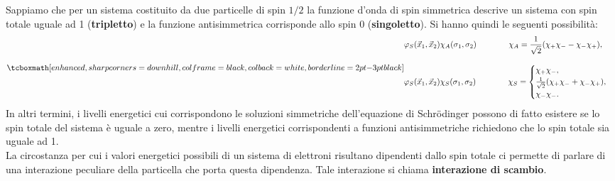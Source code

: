 Sappiamo che per un sistema costituito da due particelle di spin $1/2$ la funzione d'onda di spin simmetrica descrive un sistema con spin totale uguale ad 1 (\textbf{tripletto}) e la funzione antisimmetrica corrisponde allo spin 0 (\textbf{singoletto}). Si hanno quindi le seguenti possibilità:
	\begin{equation}
		\tcboxmath[enhanced, sharp corners=downhill, colframe=black, colback=white, borderline={2pt}{-3pt}{black}]{
		\begin{aligned}
			& \varphi_S(\vec{x}_1,\vec{x}_2)\chi_A(\sigma_1,\sigma_2)\qquad \qquad \chi_A=\frac{1}{\sqrt{2}}(\chi_+\chi_--\chi_-\chi_+) , \\[0.3cm]
			& \varphi_S(\vec{x}_1,\vec{x}_2)\chi_S(\sigma_1,\sigma_2)\qquad \qquad \chi_S=
			\begin{cases}
			\chi_+\chi_- , \\
			\frac{1}{\sqrt{2}}(\chi_+\chi_-+\chi_-\chi_+), \\
			\chi_-\chi_-.
			\end{cases}
			\end{aligned}
		} 
	\end{equation}
In altri termini, i livelli energetici cui corrispondono le soluzioni simmetriche dell'equazione di Schr\"{o}dinger possono di fatto esistere se lo spin totale del sistema è uguale a zero, mentre i livelli energetici corrispondenti a funzioni antisimmetriche richiedono che lo spin totale sia uguale ad 1.\\

La circostanza per cui i valori energetici possibili di un sistema di elettroni risultano dipendenti dallo spin totale ci permette di parlare di una interazione peculiare della particella che porta questa dipendenza. Tale interazione si chiama \textbf{interazione di scambio}.
